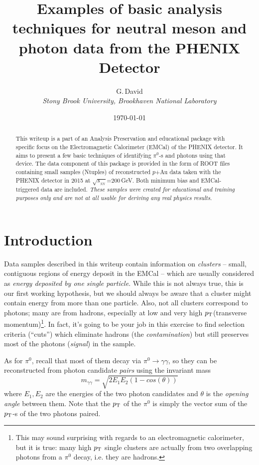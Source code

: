 \documentclass[pdftex,12pt,letter]{article}
\title{Examples of basic analysis techniques for 
    neutral meson and photon data from the PHENIX Detector}
\date{\today}
\author{G.\,David\\
{ \it Stony Brook University, Brookhaven National Laboratory}}
\newcommand{\sqsn}{\mbox{$\sqrt{s_{_{NN}}}$}\xspace}
\newcommand{\piz}{\mbox{$\pi^0$}\xspace}
\newcommand{\pt}{\mbox{$p_{\rm T}$}\xspace}
\begin{document}
\maketitle

\begin{abstract}
\noindent  This writeup is a part of an Analysis Preservation and educational
 package with specific focus  on the Electromagnetic Calorimeter (EMCal)
of the PHENIX detector. It aims to present a few basic techniques
of identifying $\pi^0$-s and photons using that device.
The data component of this package is provided in the form of ROOT files
containing small samples (Ntuples) of reconstructed $p$+Au data taken with the PHENIX detector
in 2015 at \sqsn=200\,GeV.  Both minimum bias and EMCal-triggered data are included.
\textit{These samples were created for educational and training purposes only and are not at
all usable for deriving any real physics results.}
\end{abstract}


\section{Introduction}
Data samples described in this writeup contain
information on {\it clusters} -- small, contiguous regions of energy
deposit in the EMCal -- which are usually considered as 
{\it energy deposited by one single particle}.  While this is not
always true, this is our first working hypothesis, but we should
always be aware that a cluster might contain energy from more than one
particle.  Also, not all
clusters correspond to photons; many are from hadrons, especially at
low and very high \pt (transverse momentum)\footnote{
This may sound  surprising with regards to an electromagnetic calorimeter,
but it is true: many   high \pt single clusters are actually from two
overlapping photons  from a \piz decay, i.e. they are hadrons.}. 
In fact, it's going to be your job in this exercise to find selection criteria (``cuts'')
which eliminate hadrons (the {\it contamination}) but still preserves most of the
photons (\textit{signal}) in the sample.

As for \piz, recall that most of them decay via 
$\pi^0 \rightarrow \gamma\gamma$, so they can be reconstructed from
photon candidate {\it pairs} using the invariant mass
$$ m_{\gamma\gamma} = \sqrt{2E_1E_2(1-cos(\theta))} $$
where $E_1,E_2$ are the energies of the two photon candidates and
$\theta$ is the {\it opening angle} between them.  Note that the \pt
of the \piz is simply the vector sum of the \pt-s of the two photons
paired. 
\end{document}
